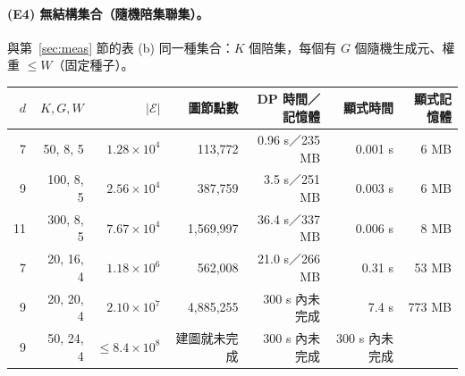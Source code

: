 \documentclass[a4paper,11pt,fontset=none]{ctexart}
\newcommand{\E}{\mathcal{E}}
\theoremstyle{definition}
\begin{document}
\paragraph{(E4) 無結構集合（隨機陪集聯集）。}與第~\ref{sec:meas} 節的表 (b) 同一種集合：$K$ 個陪集，每個有 $G$ 個隨機生成元、權重 $\le W$（固定種子）。
\begin{center}
\small
\begin{tabular}{@{}rrrrrrr@{}}
\toprule
$d$ & $K,G,W$ & $\lvert\E\rvert$ & 圖節點數 & DP 時間／記憶體 & 顯式時間 & 顯式記憶體\\
\midrule
7  & 50, 8, 5 & $1.28\times10^4$ & 113,772 & 0.96 s／235 MB & 0.001 s & 6 MB\\
9  & 100, 8, 5 & $2.56\times10^4$ & 387,759 & 3.5 s／251 MB & 0.003 s & 6 MB\\
11 & 300, 8, 5 & $7.67\times10^4$ & 1,569,997 & 36.4 s／337 MB & 0.006 s & 8 MB\\
7  & 20, 16, 4 & $1.18\times10^6$ & 562,008 & 21.0 s／266 MB & 0.31 s & 53 MB\\
9  & 20, 20, 4 & $2.10\times10^7$ & 4,885,255 & 300 s 內未完成 & 7.4 s & 773 MB\\
9  & 50, 24, 4 & $\le8.4\times10^8$ & 建圖就未完成 & 300 s 內未完成 & 300 s 內未完成 & \\
\bottomrule
\end{tabular}
\end{center}
\end{document}

